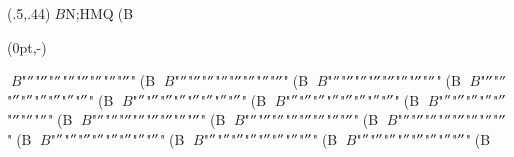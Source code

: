 \documentclass[fleqn,a4j]{jarticle}
\begin{document}
\begin{showEx}(.5,.44){$B$N;HMQ(B}
\begin{zuhaiti}
  \haiti[l](0pt,-\baselineskip){%
    \begin{minipage}{50pt}
    \end{minipage}
    }
\end{zuhaiti}%
$B$"$"$"$"$"$"$"$"$"$"$"$"$"$"$"$"$"(B
$B$"$"$"$"$"$"$"$"$"$"$"$"$"$"$"$"$"(B
$B$"$"$"$"$"$"$"$"$"$"$"$"$"$"$"$"$"(B
$B$"$"$"$"$"$"$"$"$"$"$"$"$"$"$"$"$"(B
$B$"$"$"$"$"$"$"$"$"$"$"$"$"$"$"$"$"(B
$B$"$"$"$"$"$"$"$"$"$"$"$"$"$"$"$"$"(B
$B$"$"$"$"$"$"$"$"$"$"$"$"$"$"$"$"$"(B
$B$"$"$"$"$"$"$"$"$"$"$"$"$"$"$"$"$"(B
$B$"$"$"$"$"$"$"$"$"$"$"$"$"$"$"$"$"(B
$B$"$"$"$"$"$"$"$"$"$"$"$"$"$"$"$"$"(B
$B$"$"$"$"$"$"$"$"$"$"$"$"$"$"$"$"$"(B
$B$"$"$"$"$"$"$"$"$"$"$"$"$"$"$"$"$"(B
$B$"$"$"$"$"$"$"$"$"$"$"$"$"$"$"$"$"(B
\end{showEx}
\clearpage
\end{document}
